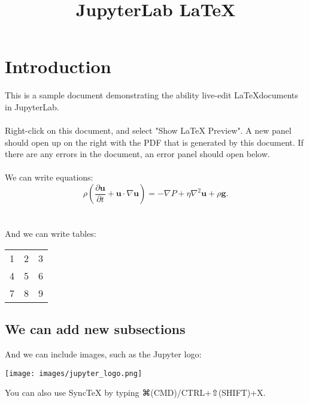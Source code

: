 \documentclass{article}
\begin{document}
\title{JupyterLab \LaTeX}
\date{}
\maketitle

\section{Introduction}
This is a sample document demonstrating the ability live-edit
\LaTeX documents in JupyterLab.
\\
\\
Right-click on this document, and select "Show LaTeX Preview".
A new panel should open up on the right with the PDF that is generated
by this document. If there are any errors in the document, an
error panel should open below.
\\
\\
We can write equations:
\begin{equation}
    \rho \left( \frac{\partial \mathbf{u}}{\partial t} + \mathbf{u} \cdot \nabla \mathbf{u} \right) =
    -\nabla P + \eta \nabla^2 \mathbf{u} + \rho \mathbf{g}.
\end{equation}
\\
\\
And we can write tables:
\begin{center}
  \begin{tabular}{ | l | c | r| }
    \hline
    1 & 2 & 3 \\ 
    4 & 5 & 6 \\ 
    7 & 8 & 9 \\
    \hline
  \end{tabular}
\end{center}

\subsection{We can add new subsections}
And we can include images, such as the Jupyter logo:
\begin{center}
  \texttt{[image: images/jupyter\_logo.png]}
\end{center}



\pagebreak




You can also use SyncTeX by typing ⌘(CMD)/CTRL+⇧(SHIFT)+X.
\end{document}
